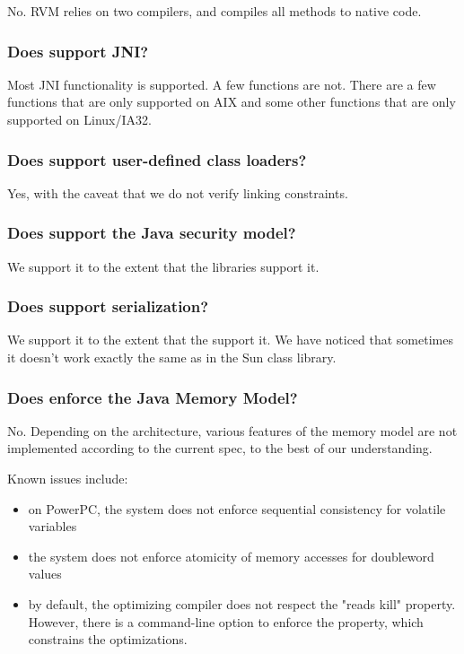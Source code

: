 No.  RVM relies on two compilers, and compiles all methods to native code.

\subsubsection{Does \jrvm{} support JNI?}

Most JNI functionality is supported. A few functions are not. 
There are a few functions that are only supported on AIX\TMweb{}
and some other functions that are only supported on Linux\Rweb{}/IA32.

\subsubsection{Does \jrvm{} support user-defined class loaders?}
Yes, with the caveat that we do not verify linking constraints.

\subsubsection{Does \jrvm{} support the Java\TMheadingweb{} security model?} 

We support it to the extent that the 
libraries support it.

\subsubsection{Does \jrvm{} support serialization?}

We support it to the extent that the 
support it. We have noticed that sometimes it doesn't
work exactly the same as in the Sun\Rweb{} class library.

\subsubsection{Does \jrvm{} enforce the Java Memory Model?}

No. Depending on the architecture, various features of the memory model
are not implemented according to the current spec, to the best of our
understanding.

Known issues include:
\begin{itemize}
\item on PowerPC\TMweb{}, the system does not enforce
sequential consistency for volatile variables
\item the system does not enforce atomicity of memory accesses for
doubleword values
\item by default, the optimizing compiler does not respect the "reads
kill" property.  However, there is a command-line option to enforce the
property, which constrains the optimizations.
\end{itemize}

